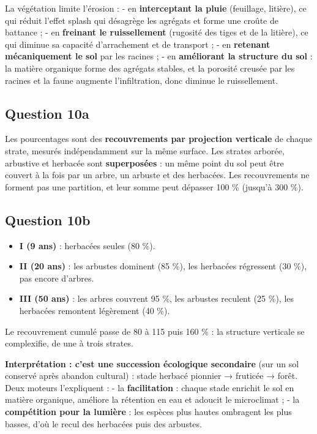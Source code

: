 \documentclass[11pt,a4paper]{article}
\providecommand{\tightlist}{\setlength{\itemsep}{0pt}\setlength{\parskip}{0pt}}
\begin{document}
La végétation limite l'érosion :
- en \textbf{interceptant la pluie} (feuillage, litière), ce qui réduit l'effet splash qui désagrège les agrégats et forme une croûte de battance ;
- en \textbf{freinant le ruissellement} (rugosité des tiges et de la litière), ce qui diminue sa capacité d'arrachement et de transport ;
- en \textbf{retenant mécaniquement le sol} par les racines ;
- en \textbf{améliorant la structure du sol} : la matière organique forme des agrégats stables, et la porosité creusée par les racines et la faune augmente l'infiltration, donc diminue le ruissellement.

\hypertarget{question-10a}{%
\subsection{Question 10a}\label{question-10a}}

Les pourcentages sont des \textbf{recouvrements par projection verticale} de chaque strate, mesurés indépendamment sur la même surface. Les strates arborée, arbustive et herbacée sont \textbf{superposées} : un même point du sol peut être couvert à la fois par un arbre, un arbuste et des herbacées. Les recouvrements ne forment pas une partition, et leur somme peut dépasser 100 \% (jusqu'à 300 \%).

\hypertarget{question-10b}{%
\subsection{Question 10b}\label{question-10b}}

\begin{itemize}
\tightlist
\item
  \textbf{I (9 ans)} : herbacées seules (80 \%).
\item
  \textbf{II (20 ans)} : les arbustes dominent (85 \%), les herbacées régressent (30 \%), pas encore d'arbres.
\item
  \textbf{III (50 ans)} : les arbres couvrent 95 \%, les arbustes reculent (25 \%), les herbacées remontent légèrement (40 \%).
\end{itemize}

Le recouvrement cumulé passe de 80 à 115 puis 160 \% : la structure verticale se complexifie, de une à trois strates.

\textbf{Interprétation : c'est une succession écologique secondaire} (sur un sol conservé après abandon cultural) : stade herbacé pionnier → fruticée → forêt. Deux moteurs l'expliquent :
- la \textbf{facilitation} : chaque stade enrichit le sol en matière organique, améliore la rétention en eau et adoucit le microclimat ;
- la \textbf{compétition pour la lumière} : les espèces plus hautes ombragent les plus basses, d'où le recul des herbacées puis des arbustes.
\end{document}
